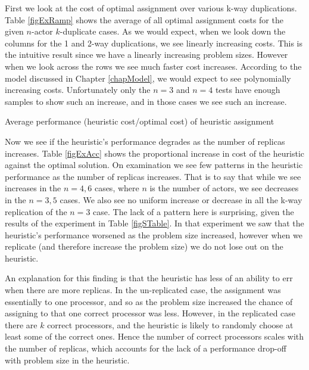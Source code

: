 First we look at the cost of optimal assignment over various k-way duplications.
Table \ref{figExRamp} shows the average of all optimal assignment costs for the given $n$-actor $k$-duplicate cases.
As we would expect, when we look down the columns for the 1 and 2-way duplications, we see linearly increasing costs.
This is the intuitive result since we have a linearly increasing problem sizes.
However when we look across the rows we see much faster cost increases.
According to the model discussed in Chapter \ref{chapModel}, we would expect to see polynomially increasing costs.
Unfortunately only the $n = 3$ and $n = 4$ tests have enough samples to show such an increase, and in those cases we see such an increase.

\begin{table}
\begin{center}
	
\caption{Average performance (heuristic cost/optimal cost) of heuristic assignment}
\label{figExAcc}
\end{center}
\end{table}

Now we see if the heuristic's performance degrades as the number of replicas increases.
Table \ref{figExAcc} shows the proportional increase in cost of the heuristic against the optimal solution.
On examination we see few patterns in the heuristic performance as the number of replicas increases.
That is to say that while we see increases in the $n=4, 6$ cases, where $n$ is the number of actors, we see decreases in the $n=3, 5$ cases.
We also see no uniform increase or decrease in all the k-way replication of the $n=3$ case.
The lack of a pattern here is surprising, given the results of the experiment in Table \ref{figSTable}.
In that experiment we saw that the heuristic's performance worsened as the problem size increased, however when we replicate (and therefore increase the problem size) we do not lose out on the heuristic.

An explanation for this finding is that the heuristic has less of an ability to err when there are more replicas.
In the un-replicated case, the assignment was essentially to one processor, and so as the problem size increased the chance of assigning to that one correct processor was less.
However, in the replicated case there are $k$ correct processors, and the heuristic is likely to randomly choose at least some of the correct ones.
Hence the number of correct processors scales with the number of replicas, which accounts for the lack of a performance drop-off with problem size in the heuristic.

